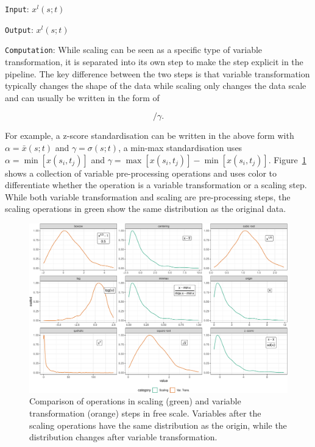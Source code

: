 \documentclass[
]{interact}
\begin{document}
\texttt{Input}: \(x^l(s; t)\)

\texttt{Output}: \(x^l(s; t)\)

\texttt{Computation}: While scaling can be seen as a specific type of
variable transformation, it is separated into its own step to make the
step explicit in the pipeline. The key difference between the two steps
is that variable transformation typically changes the shape of the data
while scaling only changes the data scale and can usually be written in
the form of

\begin{equation}
[x(s_i;t_j) - \alpha]/\gamma.
\end{equation}

For example, a z-score standardisation can be written in the above form
with \(\alpha = \bar{x}(s; t)\) and \(\gamma = \sigma(s; t)\), a min-max
standardisation uses \(\alpha = \min[x(s_i, t_j)]\) and
\(\gamma = \max[x(s_i, t_j)] - \min[x(s_i, t_j)]\).
Figure~\ref{fig-scale-var-trans-compare} shows a collection of variable
pre-processing operations and uses color to differentiate whether the
operation is a variable transformation or a scaling step. While both
variable transformation and scaling are pre-processing steps, the
scaling operations in green show the same distribution as the original
data.

\begin{figure}

{\centering \includegraphics{tidyindex_files/figure-pdf/fig-scale-var-trans-compare-1.pdf}

}

\caption{\label{fig-scale-var-trans-compare}Comparison of operations in
scaling (green) and variable transformation (orange) steps in free
scale. Variables after the scaling operations have the same distribution
as the origin, while the distribution changes after variable
transformation.}

\end{figure}
\end{document}
